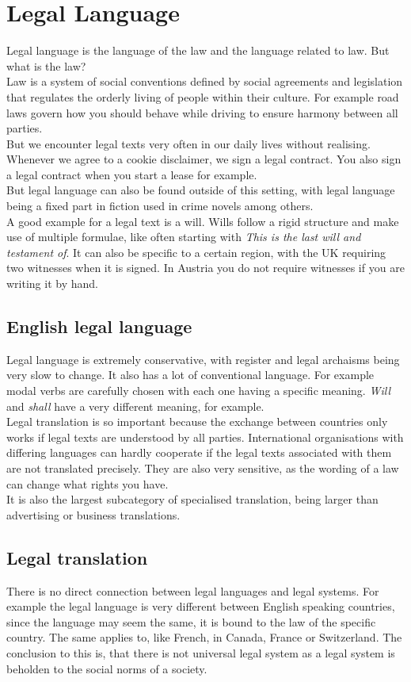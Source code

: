 \documentclass{article}
\begin{document}
	\section{Legal Language}
	Legal language is the language of the law and the language related to law. But what is the law? \\
	Law is a system of social conventions defined by social agreements and legislation that regulates the orderly living of people within their culture. For example road laws govern how you should behave while driving to ensure harmony between all parties. \\
	But we encounter legal texts very often in our daily lives without realising. Whenever we agree to a cookie disclaimer, we sign a legal contract. You also sign a legal contract when you start a lease for example. \\
	But legal language can also be found outside of this setting, with legal language being a fixed part in fiction used in crime novels among others. \\
	A good example for a legal text is a will. Wills follow a rigid structure and make use of multiple formulae, like often starting with \textit{This is the last will and testament of}. It can also be specific to a certain region, with the UK requiring two witnesses when it is signed. In Austria you do not require witnesses if you are writing it by hand. \\
	\subsection{English legal language}
	Legal language is extremely conservative, with register and legal archaisms being very slow to change. It also has a lot of conventional language. For example modal verbs are carefully chosen with each one having a specific meaning. \textit{Will} and \textit{shall} have a very different meaning, for example. \\
	Legal translation is so important because the exchange between countries only works if legal texts are understood by all parties. International organisations with differing languages can hardly cooperate if the legal texts associated with them are not translated precisely. They are also very sensitive, as the wording of a law can change what rights you have.\\
	It is also the largest subcategory of specialised translation, being larger than advertising or business translations. \\
	\subsection{Legal translation}
	There is no direct connection between legal languages and legal systems. For example the legal language is very different between English speaking countries, since the language may seem the same, it is bound to the law of the specific country. The same applies to, like French, in Canada, France or Switzerland. The conclusion to this is, that there is not universal legal system as a legal system is beholden to the social norms of a society. \\
\end{document}
